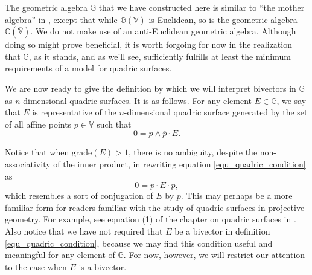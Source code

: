 \documentclass{birkjour}
\theoremstyle{definition}
\theoremstyle{remark}
\numberwithin{equation}{section}
\newcommand{\G}{\mathbb{G}}
\newcommand{\V}{\mathbb{V}}
\begin{document}
The geometric algebra $\G$ that we have constructed here is similar to ``the mother algebra''
in \cite{DoranHestenes93}, except that while $\G(\V)$
is Euclidean, so is the geometric algebra $\G(\overline{\V})$.  We do not
make use of an anti-Euclidean geometric algebra.  Although doing so might prove beneficial,
it is worth forgoing for now in the realization that $\G$, as it stands, and as we'll see, sufficiently
fulfills at least the minimum requirements of a model for quadric surfaces.

We are now ready to give the definition by which we will interpret bivectors in $\G$
as $n$-dimensional quadric surfaces.  It is as follows.
For any element $E\in\G$, we say that $E$ is representative of the $n$-dimensional
quadric surface generated by the set of all affine points $p\in\V$ such that
\begin{equation}\label{equ_quadric_condition}
0 = p\wedge\overline{p}\cdot E.
\end{equation}

Notice that when $\mbox{grade}(E)>1$, there is no ambiguity, despite the non-associativity
of the inner product, in rewriting equation
\eqref{equ_quadric_condition} as
\begin{equation}
0 = p\cdot E\cdot\overline{p},
\end{equation}
which resembles a sort of conjugation of $E$ by $p$.  This may perhaps be a more
familiar form for readers familiar with the study of quadric surfaces in projective geometry.
For example, see equation (1) of the chapter on quadric surfaces in \cite{MehlhornYap04}.
Also notice that we have not required that $E$ be a bivector in definition \eqref{equ_quadric_condition},
because we may find this condition useful and meaningful for any element of $\G$.  For now,
however, we will restrict our attention to the case when $E$ is a bivector.
\end{document}
